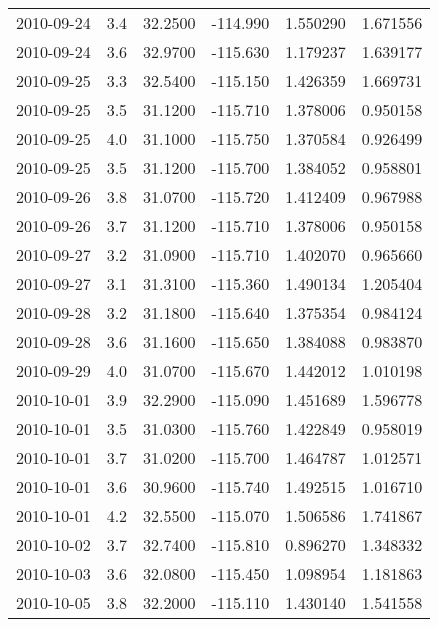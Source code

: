 \begin{tabular}{lrrrrr}
2010-09-24 &       3.4 &  32.2500 &  -114.990 &         1.550290 &         1.671556 \\
2010-09-24 &       3.6 &  32.9700 &  -115.630 &         1.179237 &         1.639177 \\
2010-09-25 &       3.3 &  32.5400 &  -115.150 &         1.426359 &         1.669731 \\
2010-09-25 &       3.5 &  31.1200 &  -115.710 &         1.378006 &         0.950158 \\
2010-09-25 &       4.0 &  31.1000 &  -115.750 &         1.370584 &         0.926499 \\
2010-09-25 &       3.5 &  31.1200 &  -115.700 &         1.384052 &         0.958801 \\
2010-09-26 &       3.8 &  31.0700 &  -115.720 &         1.412409 &         0.967988 \\
2010-09-26 &       3.7 &  31.1200 &  -115.710 &         1.378006 &         0.950158 \\
2010-09-27 &       3.2 &  31.0900 &  -115.710 &         1.402070 &         0.965660 \\
2010-09-27 &       3.1 &  31.3100 &  -115.360 &         1.490134 &         1.205404 \\
2010-09-28 &       3.2 &  31.1800 &  -115.640 &         1.375354 &         0.984124 \\
2010-09-28 &       3.6 &  31.1600 &  -115.650 &         1.384088 &         0.983870 \\
2010-09-29 &       4.0 &  31.0700 &  -115.670 &         1.442012 &         1.010198 \\
2010-10-01 &       3.9 &  32.2900 &  -115.090 &         1.451689 &         1.596778 \\
2010-10-01 &       3.5 &  31.0300 &  -115.760 &         1.422849 &         0.958019 \\
2010-10-01 &       3.7 &  31.0200 &  -115.700 &         1.464787 &         1.012571 \\
2010-10-01 &       3.6 &  30.9600 &  -115.740 &         1.492515 &         1.016710 \\
2010-10-01 &       4.2 &  32.5500 &  -115.070 &         1.506586 &         1.741867 \\
2010-10-02 &       3.7 &  32.7400 &  -115.810 &         0.896270 &         1.348332 \\
2010-10-03 &       3.6 &  32.0800 &  -115.450 &         1.098954 &         1.181863 \\
2010-10-05 &       3.8 &  32.2000 &  -115.110 &         1.430140 &         1.541558 \\

\end{tabular}
